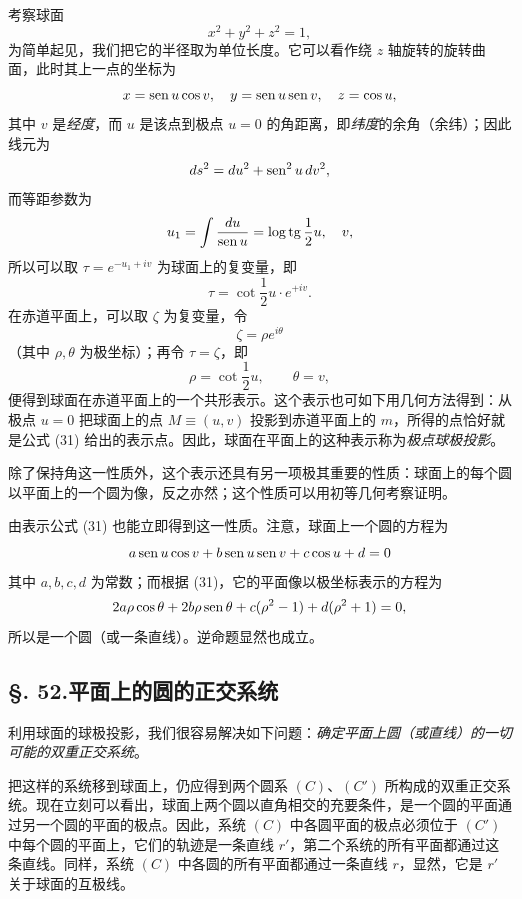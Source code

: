 考察球面
\[
 x^2+y^2+z^2=1,
\]
为简单起见，我们把它的半径取为单位长度。它可以看作绕 \(z\) 轴旋转的旋转曲面，此时其上一点的坐标为
\[
 x=\operatorname{sen} u\cos v,
 \quad
 y=\operatorname{sen} u\operatorname{sen} v,
 \quad
 z=\cos u,
\]
其中 \(v\) 是\emph{经度}，而 \(u\) 是该点到极点 \(u=0\) 的角距离，即\emph{纬度}的余角（余纬）；因此线元为
\[
 ds^2=du^2+\operatorname{sen}^2u\,dv^2,
\]
而等距参数为
\[
 u_1=\int\frac{du}{\operatorname{sen} u}=\log\operatorname{tg}\frac{1}{2}u,
 \quad v,
\]
所以可以取 \(\tau=e^{-u_1+iv}\) 为球面上的复变量，即
\begin{equation}\tag{30}
 \tau=\cot\frac{1}{2}u\cdot e^{+iv}.
\end{equation}
在赤道平面上，可以取 \(\zeta\) 为复变量，令
\[
 \zeta=\rho e^{i\theta}
\]
（其中 \(\rho,\theta\) 为极坐标）；再令 \(\tau=\zeta\)，即
\begin{equation}\tag{31}
 \rho=\cot\frac{1}{2}u,
 \qquad
 \theta=v,
\end{equation}
便得到球面在赤道平面上的一个共形表示。这个表示也可如下用几何方法得到：从极点 \(u=0\) 把球面上的点 \(M\equiv(u,v)\) 投影到赤道平面上的 \(m\)，所得的点恰好就是公式 (31) 给出的表示点。因此，球面在平面上的这种表示称为\emph{极点球极投影}。

除了保持角这一性质外，这个表示还具有另一项极其重要的性质：球面上的每个圆以平面上的一个圆为像，反之亦然；这个性质可以用初等几何考察证明。

由表示公式 (31) 也能立即得到这一性质。注意，球面上一个圆的方程为
\[
 a\operatorname{sen} u\cos v+b\operatorname{sen} u\operatorname{sen} v+c\cos u+d=0
\]
其中 \(a,b,c,d\) 为常数；而根据 (31)，它的平面像以极坐标表示的方程为
\[
 2a\rho\cos\theta+2b\rho\operatorname{sen}\theta+c(\rho^2-1)+d(\rho^2+1)=0,
\]
所以是一个圆（或一条直线）。逆命题显然也成立。

\subsection*{\S. 52.\quad 平面上的圆的正交系统}

利用球面的球极投影，我们很容易解决如下问题：\emph{确定平面上圆（或直线）的一切可能的双重正交系统}。

把这样的系统移到球面上，仍应得到两个圆系 \((C)\)、\((C')\) 所构成的双重正交系统。现在立刻可以看出，球面上两个圆以直角相交的充要条件，是一个圆的平面通过另一个圆的平面的极点。因此，系统 \((C)\) 中各圆平面的极点必须位于 \((C')\) 中每个圆的平面上，它们的轨迹是一条直线 \(r'\)，第二个系统的所有平面都通过这条直线。同样，系统 \((C)\) 中各圆的所有平面都通过一条直线 \(r\)，显然，它是 \(r'\) 关于球面的互极线。

